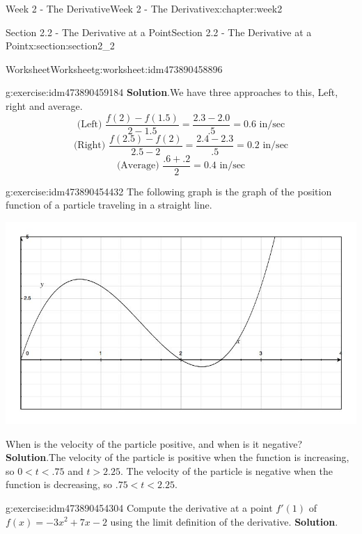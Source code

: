 \documentclass[oneside,10pt,]{book}
\newcommand{\blocktitlefont}{\relax}
\numberwithin{equation}{section}
\begin{document}
\begin{chapterptx}{Week 2 - The Derivative}{}{Week 2 - The Derivative}{}{}{x:chapter:week2}
\begin{sectionptx}{Section 2.2 - The Derivative at a Point}{}{Section 2.2 - The Derivative at a Point}{}{}{x:section:section2_2}
\begin{worksheet-subsection}{Worksheet}{}{Worksheet}{}{}{g:worksheet:idm473890458896}
\begin{divisionexercise}{1}{}{}{g:exercise:idm473890459184}
\textbf{\blocktitlefont Solution}.\hypertarget{g:solution:idm473890458640}{}\quad{}We have three approaches to this, Left, right and average.%
\begin{equation*}
\text{(Left) } \frac{f(2)-f(1.5)}{2-1.5} = \frac{2.3-2.0}{.5} = 0.6 \text{ in/sec}
\end{equation*}
%
\begin{equation*}
\text{(Right) } \frac{f(2.5)-f(2)}{2.5-2} = \frac{2.4-2.3}{.5} = 0.2 \text{ in/sec}
\end{equation*}
%
\begin{equation*}
\text{(Average) } \frac{.6+.2}{2} = 0.4 \text{ in/sec}
\end{equation*}
%
\end{divisionexercise}%
\begin{divisionexercise}{2}{}{}{g:exercise:idm473890454432}%
The following graph is the graph of the position function of a particle traveling in a straight line. \begin{image}{0}{1}{0}%
\includegraphics[width=\linewidth]{images/Math140S13wksht5g1.jpg}
\end{image}%
 When is the velocity of the particle positive, and when is it negative?%
\textbf{\blocktitlefont Solution}.\hypertarget{g:solution:idm473890454048}{}\quad{}The velocity of the particle is positive when the function is increasing, so \(0 < t < .75 \) and \(t > 2.25\). The velocity of the particle is negative when the function is decreasing, so \(.75 < t < 2.25\).%
\end{divisionexercise}%
\begin{divisionexercise}{3}{}{}{g:exercise:idm473890454304}%
Compute the derivative at a point \(f'(1)\) of \(f(x)=-3x^2+7x-2\) using the limit definition of the derivative.%
\textbf{\blocktitlefont Solution}.\hypertarget{g:solution:idm473890451152}{}\quad{}%

\end{divisionexercise}
\end{worksheet-subsection}
\end{sectionptx}
\end{chapterptx}
\end{document}

